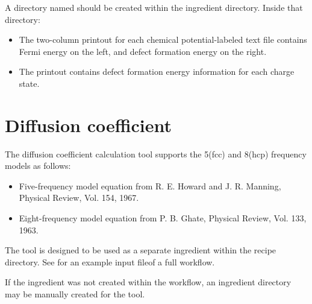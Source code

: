 \documentclass[letterpaper,10pt,english]{sphinxmanual}
\begin{document}
A directory named  should be created within the ingredient directory. Inside that directory:
\begin{itemize}
\item {} 
The two-column printout for each chemical potential-labeled text file contains Fermi energy on the left, and defect formation energy on the right.

\item {} 
The  printout contains defect formation energy information for each charge state.

\end{itemize}


\section{Diffusion coefficient}
\label{6_0_postprocessingtools:diffusion-coefficient}
The  diffusion coefficient calculation tool supports the 5(fcc) and 8(hcp) frequency models as follows:
\begin{itemize}
\item {} 
Five-frequency model equation from R. E. Howard and J. R. Manning, Physical Review, Vol. 154, 1967.

\item {} 
Eight-frequency model equation from P. B. Ghate, Physical Review, Vol. 133, 1963.

\end{itemize}

The tool is designed to be used as a separate ingredient within the recipe directory. See  for an example input fileof a full workflow.

If the ingredient was not created within the workflow, an ingredient directory may be manually created for the tool.
\end{document}
